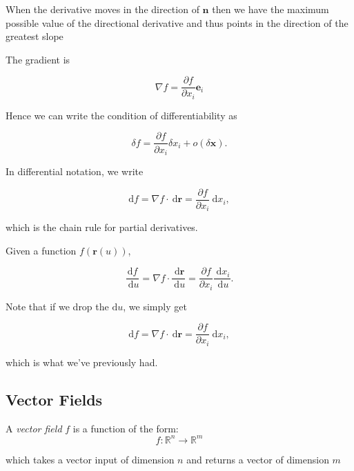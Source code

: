 \begin{nrem}
	When the derivative moves in the direction of $\mathbf{n}$ then we have the maximum possible value of the directional derivative and thus points in the direction of the greatest slope
\end{nrem}

\begin{nthm}
	The gradient is
	
	$$
	\nabla f=\frac{\partial f}{\partial x_i} \mathbf{e}_i
	$$
	
	
	Hence we can write the condition of differentiability as
	
	$$
	\delta f=\frac{\partial f}{\partial x_i} \delta x_i+o(\delta \mathbf{x}) .
	$$
	
	
	In differential notation, we write
	
	$$
	\mathrm{d} f=\nabla f \cdot \mathrm{~d} \mathbf{r}=\frac{\partial f}{\partial x_i} \mathrm{~d} x_i,
	$$
	
	which is the chain rule for partial derivatives.
\end{nthm}

\begin{nthm}
	Given a function $f(\mathbf{r}(u))$,
	
	$$
	\frac{\mathrm{d} f}{\mathrm{~d} u}=\nabla f \cdot \frac{\mathrm{~d} \mathbf{r}}{\mathrm{~d} u}=\frac{\partial f}{\partial x_i} \frac{\mathrm{~d} x_i}{\mathrm{~d} u} .
	$$
	
	
	Note that if we drop the $\mathrm{d} u$, we simply get
	
	$$
	\mathrm{d} f=\nabla f \cdot \mathrm{~d} \mathbf{r}=\frac{\partial f}{\partial x_i} \mathrm{~d} x_i,
	$$
	
	which is what we've previously had.
\end{nthm}

\subsection{Vector Fields}

\begin{ndefi}
	A  \emph{vector field} $f$ is a function of the form:
	$$
	f: \mathbb{R}^n \rightarrow \mathbb{R}^m
	$$
	
	which takes a vector input of dimension $n$  and returns a vector of dimension $m$
\end{ndefi}

